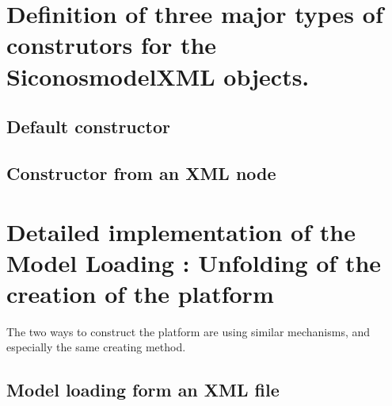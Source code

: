
\section{Definition of three major types of construtors for the SiconosmodelXML objects.}


\subsection{Default constructor}

\subsection{Constructor from an XML node}


\section{Detailed implementation of the Model Loading : Unfolding of the creation of the platform}
The two ways to construct the platform are using similar mechanisms, and especially the same creating
method.



\subsection{Model loading form an XML file}




